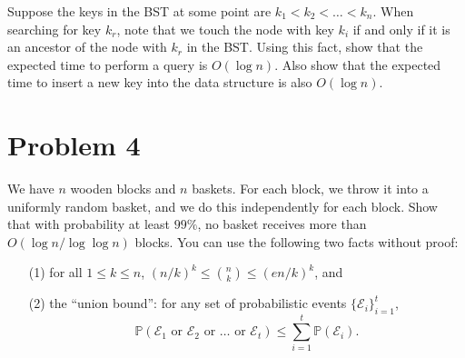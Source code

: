 \documentclass[12pt]{article}
\begin{document}
Suppose the keys in the BST at some point are $k_1 < k_2 < \ldots < k_n$. When searching for key $k_r$, note that we touch the node with key $k_i$ if and only if it is an ancestor of the node with $k_r$ in the BST. Using this fact, show that the expected time to perform a query is $O(\log n)$. Also show that the expected time to insert a new key into the data structure is also $O(\log n)$.

\section*{Problem 4}

We have $n$ wooden blocks and $n$ baskets. For each block, we throw it into a uniformly random basket, and we do this independently for each block. Show that with probability at least $99\%$, no basket receives more than $O(\log n / \log\log n)$ blocks. You can use the following two facts without proof: 
\begin{itemize}
\item[(1)] for all $1\le k\le n$, $(n/k)^k \le \binom{n}{k} \le (en/k)^k$, and 
\item[(2)] the ``union bound'': for any set of probabilistic events $\{\mathcal{E}_i\}_{i=1}^t$, 
$$\mathbb{P}(\mathcal{E}_1 \text{ or } \mathcal{E}_2 \text{ or } \ldots \text{ or }  \mathcal{E}_t) \le \sum_{i=1}^t \mathbb{P}(\mathcal{E}_i) .$$
\end{itemize}
\end{document}
